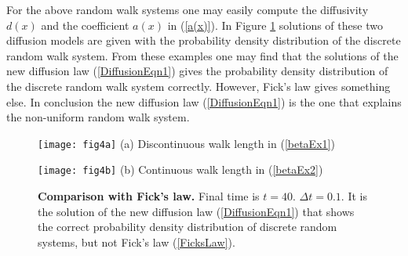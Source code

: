\documentclass[11pt]{amsart}
\begin{document}
For the above random walk systems one may easily compute the diffusivity $d(x)$ and the coefficient $a(x)$ in (\ref{a(x)}). In Figure \ref{fig4} solutions of these two diffusion models are given with the probability density distribution of the discrete random walk system. From these examples one may find that the solutions of the new diffusion law (\ref{DiffusionEqn1}) gives the probability density distribution of the discrete random walk system correctly. However, Fick's law gives something else. In conclusion the new diffusion law (\ref{DiffusionEqn1}) is the one that explains the non-uniform random walk system.

\begin{figure}[ht]
\begin{minipage}[t]{0.49\textwidth}
 \centering
 \texttt{[image: fig4a]}
(a) Discontinuous walk length in (\ref{betaEx1})
\end{minipage}
\begin{minipage}[t]{0.49\textwidth}
\centering
 \texttt{[image: fig4b]}
(b) Continuous walk length in (\ref{betaEx2})
\end{minipage}
\caption{{\bf Comparison with Fick's law.} Final time is $t=40$. $\Delta t=0.1$. It is the solution of the new diffusion law (\ref{DiffusionEqn1}) that shows the correct probability density distribution of discrete random systems, but not Fick's law (\ref{FicksLaw}).} \label{fig4}
\end{figure}
\end{document}

